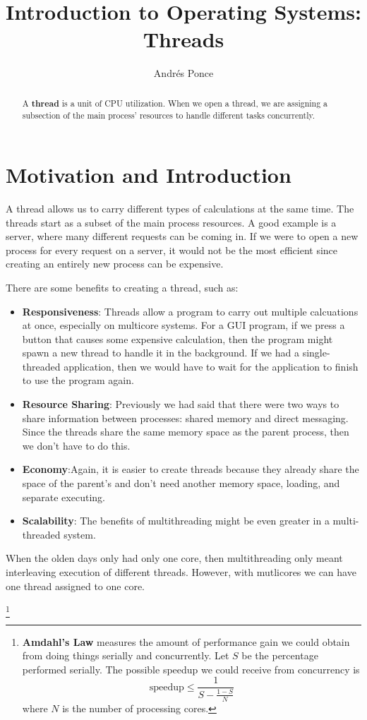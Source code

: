 \documentclass{tufte-handout}
\title{Introduction to Operating Systems: Threads}
\author{Andr\'es Ponce}
\begin{document}
\begin{abstract}
A \textbf{thread} is a unit of CPU utilization. When 
we open a thread, we are assigning a subsection of the 
main process' resources to handle different tasks 
concurrently.
\end{abstract}

\section{Motivation and Introduction}
A thread allows us to carry different types of calculations at the same time.
The threads start as a subset of the main process resources. A good example is a 
server, where many different requests can be coming in. If we were to open a 
new process for every request on a server, it would not be the most efficient 
since creating an entirely new process can be expensive. 

There are some benefits to creating a thread, such as:
\begin{itemize}
	\item \textbf{Responsiveness}: Threads allow a program to carry out multiple
		calcuations at once, especially on multicore systems. For a GUI program,
		if we press a button that causes some expensive calculation, then the
		program might spawn a new thread to handle it in the background. If 
		we had a single-threaded application, then we would have to wait for the 
		application to finish to use the program again.
	\item \textbf{Resource Sharing}: Previously we had said that there were two ways to
		share information between processes: shared memory and direct messaging. Since the
		threads share the same memory space as the parent process, then we don't have to do this.
	\item \textbf{Economy}:Again, it is easier to create threads because they already 
		share the space of the parent's and don't need another memory space, loading,
		and separate executing.
	\item \textbf{Scalability}: The benefits of multithreading might be even greater
		in a multi-threaded system.
\end{itemize}

When the olden days only had only one core, then multithreading only meant
interleaving execution of different threads. However, with mutlicores we can have 
one thread assigned to one core.

\footnote{\textbf{Amdahl's Law} measures the amount of performance gain we could obtain from 
doing things serially and concurrently. Let $S$ be the percentage performed serially. The 
possible speedup we could receive from concurrency is 
\[\textrm{speedup}\leq \frac{1}{S - \frac{1 - S}{N}}\]
where $N$ is the number of processing cores.
}
\end{document}
